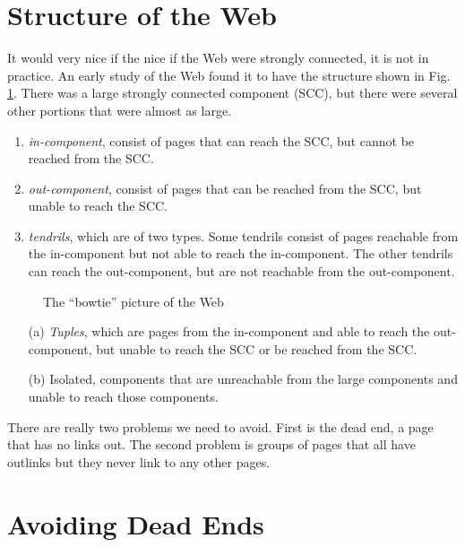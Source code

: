 \section{Structure of the Web}\label{sec:def-pagerank}

It would very nice if the nice if the Web were strongly connected, it is not in practice. An early study of the Web found it to have the structure shown in Fig. \ref{fig:bowtie-web}. There was a large strongly connected component (SCC), but there were several other portions that were almost as large.

\begin{enumerate}
    \item \textit{in-component}, consist of pages that can reach the SCC, but cannot be reached from the SCC.
    \item \textit{out-component}, consist of pages that can be reached from the SCC, but unable to reach the SCC.
    \item \textit{tendrils}, which are of two types. Some tendrils consist of pages reachable from the in-component but not able to reach the in-component. The other tendrils can reach the out-component, but are not reachable from the out-component. 
\end{enumerate}


\begin{figure}[H]
\centering
\scalebox{1}{
    
}
\caption{The ``bowtie'' picture of the Web}
\label{fig:bowtie-web}
\end{figure}

\begin{itemize}
    \item[(a)] \textit{Tuples}, which are pages from the in-component and able to reach the out-component, but unable to reach the SCC or be reached from the SCC.    
    \item[(b)] Isolated, components that are unreachable from the large components and unable to reach those components.
\end{itemize}

There are really two problems we need to avoid. First is the dead end, a page that has no links out. The second problem is groups of pages that all have outlinks but they never link to any other pages. 

\section{Avoiding Dead Ends}\label{sec:avoid-dead-ends}

